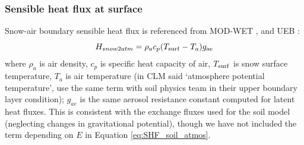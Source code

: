 \documentclass[twoside,10pt]{report}
\begin{document}
\subsubsection{Sensible heat flux at surface}
Snow-air boundary sensible heat flux is referenced from MOD-WET \citep{Margulis}, and UEB \citep{You2014}:
\begin{equation}
H_{snow2atm}= \rho_a c_p (T_{\rm surf}-T_{a})g_{\rm ae}
\end{equation}
where $\rho_a$ is air density, $c_p$ is specific heat capacity of air, $T_{\rm surf}$ is snow surface temperature, $T_{a}$ is air temperature (in CLM said ‘atmosphere potential temperature’, use the same term with soil physics team in their upper boundary layer condition); $g_{ae}$ is the same aerosol resistance constant computed for latent heat fluxes. This is consistent with the exchange fluxes used for the soil model (neglecting changes in gravitational potential), though we have not included the term depending on $E$ in Equation \eqref{eq:SHF_soil_atmos}.

\end{document}
